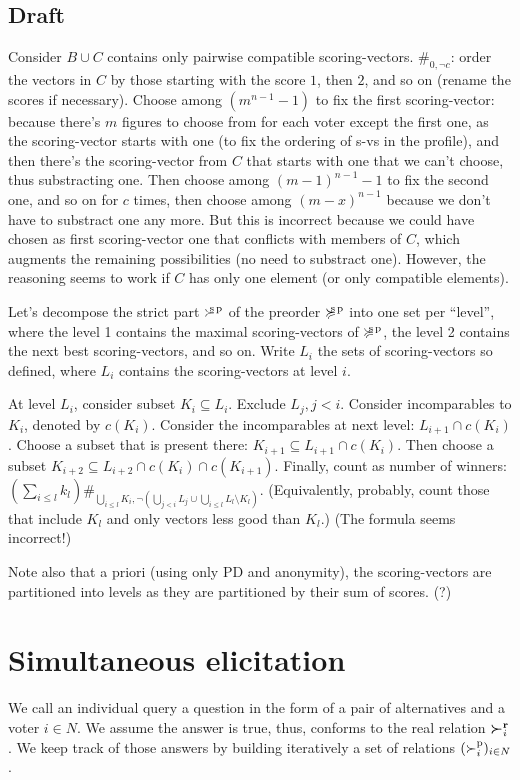 \documentclass[version=last, pagesize, twoside=off, bibliography=totoc, DIV=calc, fontsize=14pt, a4paper, french, english]{scrartcl}
\begin{document}
\subsection{Draft}
Consider $B ∪ C$ contains only pairwise compatible scoring-vectors. $\#_{0, ¬c}$: order the vectors in $C$ by those starting with the score $1$, then $2$, and so on (rename the scores if necessary). Choose among $(m^{n-1} - 1)$ to fix the first scoring-vector: because there’s $m$ figures to choose from for each voter except the first one, as the scoring-vector starts with one (to fix the ordering of s-vs in the profile), and then there’s the scoring-vector from $C$ that starts with one that we can’t choose, thus substracting one. Then choose among $(m-1)^{n-1}-1$ to fix the second one, and so on for $c$ times, then choose among $(m-x)^{n-1}$ because we don’t have to substract one any more. But this is incorrect because we could have chosen as first scoring-vector one that conflicts with members of $C$, which augments the remaining possibilities (no need to substract one). However, the reasoning seems to work if $C$ has only one element (or only compatible elements).

Let’s decompose the strict part $\succ^\text{\!\!\!s\,p}$ of the preorder $\succcurlyeq^\text{\!\!\!s\,p}$ into one set per “level”, where the level 1 contains the maximal scoring-vectors of $\succcurlyeq^\text{\!\!\!s\,p}$, the level 2 contains the next best scoring-vectors, and so on. Write $L_i$ the sets of scoring-vectors so defined, where $L_i$ contains the scoring-vectors at level $i$. 

At level $L_i$, consider subset $K_i \subseteq L_i$. Exclude $L_j, j < i$. Consider incomparables to $K_i$, denoted by $c(K_i)$. Consider the incomparables at next level: $L_{i+1} ∩ c(K_i)$. Choose a subset that is present there: $K_{i + 1} \subseteq L_{i+1} ∩ c(K_i)$. Then choose a subset $K_{i + 2} \subseteq L_{i + 2} ∩ c(K_i) ∩ c(K_{i + 1})$. Finally, count as number of winners: $(\sum_{i ≤ l} k_l) \#_{\bigcup_{i ≤ l} K_i, ¬(\bigcup_{j < i} L_j ∪ \bigcup_{i ≤ l}L_l \setminus K_l)}$. (Equivalently, probably, count those that include $K_l$ and only vectors less good than $K_l$.) (The formula seems incorrect!)

Note also that a priori (using only PD and anonymity), the scoring-vectors are partitioned into levels as they are partitioned by their sum of scores. (?)

\section{Simultaneous elicitation}
We call an individual query a question in the form of a pair of alternatives and a voter $i \in N$. We assume the answer is true, thus, conforms to the real relation $\boldsymbol{\succ}^\textbf{r}_i$. We keep track of those answers by building iteratively a set of relations $(\succ_i^\text{p})_{i \in N}$.
\end{document}

